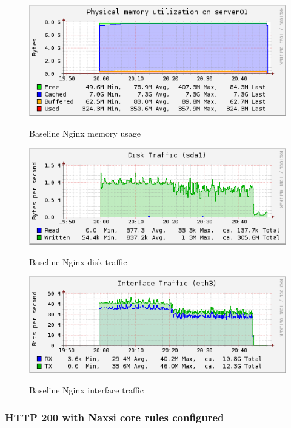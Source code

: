 \documentclass[Measurements]{subfiles}
\begin{document}
\begin{figure}[H]
\centering
\caption{Baseline Nginx memory usage}
\includegraphics[scale=0.7]{images/results/200_with_naxsi_compiled/memory.png}
\label{fig:Baseline Nginx memory usage}
\end{figure}

\begin{figure}[H]
\centering
\caption{Baseline Nginx disk traffic}
\includegraphics[scale=0.7]{images/results/200_with_naxsi_compiled/disk.png}
\label{fig:Baseline Nginx disk traffic}
\end{figure}

\begin{figure}[H]
\centering
\caption{Baseline Nginx interface traffic}
\includegraphics[scale=0.7]{images/results/200_with_naxsi_compiled/interface.png}
\label{fig:Baseline Nginx interface traffic}
\end{figure}

\subsubsection{HTTP 200 with Naxsi core rules configured}
\end{document}
